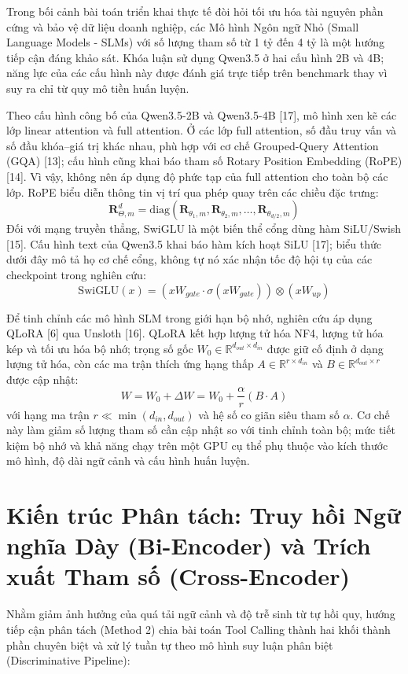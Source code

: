 Trong bối cảnh bài toán triển khai thực tế đòi hỏi tối ưu hóa tài nguyên phần cứng và bảo vệ dữ liệu doanh nghiệp, các Mô hình Ngôn ngữ Nhỏ (Small Language Models - SLMs) với số lượng tham số từ 1 tỷ đến 4 tỷ là một hướng tiếp cận đáng khảo sát. Khóa luận sử dụng Qwen3.5 ở hai cấu hình 2B và 4B; năng lực của các cấu hình này được đánh giá trực tiếp trên benchmark thay vì suy ra chỉ từ quy mô tiền huấn luyện.

Theo cấu hình công bố của Qwen3.5-2B và Qwen3.5-4B [17], mô hình xen kẽ các lớp linear attention và full attention. Ở các lớp full attention, số đầu truy vấn và số đầu khóa–giá trị khác nhau, phù hợp với cơ chế Grouped-Query Attention (GQA) [13]; cấu hình cũng khai báo tham số Rotary Position Embedding (RoPE) [14]. Vì vậy, không nên áp dụng độ phức tạp của full attention cho toàn bộ các lớp. RoPE biểu diễn thông tin vị trí qua phép quay trên các chiều đặc trưng:
$$\mathbf{R}_{\Theta, m}^d = \text{diag}\left(\mathbf{R}_{\theta_1, m}, \mathbf{R}_{\theta_2, m}, \dots, \mathbf{R}_{\theta_{d/2}, m}\right)$$
Đối với mạng truyền thẳng, SwiGLU là một biến thể cổng dùng hàm SiLU/Swish [15]. Cấu hình text của Qwen3.5 khai báo hàm kích hoạt SiLU [17]; biểu thức dưới đây mô tả họ cơ chế cổng, không tự nó xác nhận tốc độ hội tụ của các checkpoint trong nghiên cứu:
$$\text{SwiGLU}(x) = \left(x W_{gate} \cdot \sigma(x W_{gate})\right) \otimes (x W_{up})$$

Để tinh chỉnh các mô hình SLM trong giới hạn bộ nhớ, nghiên cứu áp dụng QLoRA [6] qua Unsloth [16]. QLoRA kết hợp lượng tử hóa NF4, lượng tử hóa kép và tối ưu hóa bộ nhớ; trọng số gốc $W_0 \in \mathbb{R}^{d_{out} \times d_{in}}$ được giữ cố định ở dạng lượng tử hóa, còn các ma trận thích ứng hạng thấp $A \in \mathbb{R}^{r \times d_{in}}$ và $B \in \mathbb{R}^{d_{out} \times r}$ được cập nhật:
$$W = W_0 + \Delta W = W_0 + \frac{\alpha}{r} (B \cdot A)$$
với hạng ma trận $r \ll \min(d_{in}, d_{out})$ và hệ số co giãn siêu tham số $\alpha$. Cơ chế này làm giảm số lượng tham số cần cập nhật so với tinh chỉnh toàn bộ; mức tiết kiệm bộ nhớ và khả năng chạy trên một GPU cụ thể phụ thuộc vào kích thước mô hình, độ dài ngữ cảnh và cấu hình huấn luyện.

\section{Kiến trúc Phân tách: Truy hồi Ngữ nghĩa Dày (Bi-Encoder) và Trích xuất Tham số (Cross-Encoder)}

Nhằm giảm ảnh hưởng của quá tải ngữ cảnh và độ trễ sinh từ tự hồi quy, hướng tiếp cận phân tách (Method 2) chia bài toán Tool Calling thành hai khối thành phần chuyên biệt và xử lý tuần tự theo mô hình suy luận phân biệt (Discriminative Pipeline):

